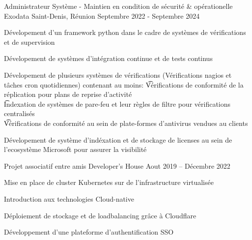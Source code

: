 
\begin{cventries}
  \cventry
    {Administrateur Système - Maintien en condition de sécurité \& opérationelle}
    {Exodata}
    {Saint-Denis, Réunion}
    {Septembre 2022 - Septembre 2024}
    {
      \begin{cvitems}
       \item{Dévelopement d'un framework python dans le cadre de systèmes de vérifications et de supervision}
       \item{Dévelopement de systèmes d'intégration continue et de tests continus}
       \item{
        Dévelopement de plusieurs systèmes de vérifications (Vérifications nagios et tâches cron quotidiennes) contenant au moins: 
        \t  * Vérifications de conformité de la réplication pour plans de reprise d'activité \\
        \t  * Indexation de systèmes de pare-feu et leur règles de filtre pour vérifications centralisés \\
        \t  * Vérifications de conformité au sein de plate-formes d'antivirus vendues au clients
        }
        \item{Dévelopement de système d'indéxation et de stockage de licenses au sein de l'ecosystème Microsoft pour assurer la visibilité}
      \end{cvitems}
    }
  \cventry
    {Projet associatif entre amis}
    {Developer's House}
    {}
    {Aout 2019 -- Décembre 2022}
    {
    \begin{cvitems}
      \item{Mise en place de cluster Kubernetes sur de l'infrastructure virtualisée}
      \item{Introduction aux technologies Cloud-native}
      \item{Déploiement de stockage et de loadbalancing grâce à Cloudflare}
      \item{Développement d'une plateforme d'authentification SSO}
    \end{cvitems}
    }
    
\end{cventries}
